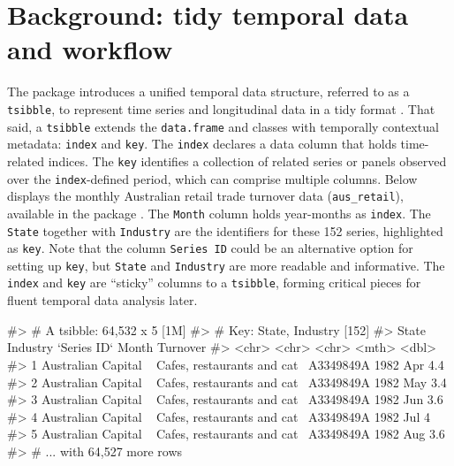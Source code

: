 \hypertarget{background-tidy-temporal-data-and-workflow}{%
\section{Background: tidy temporal data and
workflow}\label{background-tidy-temporal-data-and-workflow}}

The  package \citep{wang2020tsibble} introduces a
unified temporal data structure, referred to as a \texttt{tsibble}, to
represent time series and longitudinal data in a tidy format
\citep{wickham2014tidy}. That said, a \texttt{tsibble} extends the
\texttt{data.frame} and  classes with temporally
contextual metadata: \texttt{index} and \texttt{key}. The \texttt{index}
declares a data column that holds time-related indices. The \texttt{key}
identifies a collection of related series or panels observed over the
\texttt{index}-defined period, which can comprise multiple columns.
Below displays the monthly Australian retail trade turnover data
(\texttt{aus\_retail}), available in the  package
\citep{R-tsibbledata}. The \texttt{Month} column holds year-months as
\texttt{index}. The \texttt{State} together with \texttt{Industry} are
the identifiers for these 152 series, highlighted as \texttt{key}. Note
that the column \texttt{Series\ ID} could be an alternative option for
setting up \texttt{key}, but \texttt{State} and \texttt{Industry} are
more readable and informative. The \texttt{index} and \texttt{key} are
``sticky'' columns to a \texttt{tsibble}, forming critical pieces for
fluent temporal data analysis later.

\begin{Schunk}
\begin{Soutput}
#> # A tsibble: 64,532 x 5 [1M]
#> # Key:       State, Industry [152]
#>   State                Industry                    `Series ID`    Month Turnover
#>   <chr>                <chr>                       <chr>          <mth>    <dbl>
#> 1 Australian Capital ~ Cafes, restaurants and cat~ A3349849A   1982 Apr      4.4
#> 2 Australian Capital ~ Cafes, restaurants and cat~ A3349849A   1982 May      3.4
#> 3 Australian Capital ~ Cafes, restaurants and cat~ A3349849A   1982 Jun      3.6
#> 4 Australian Capital ~ Cafes, restaurants and cat~ A3349849A   1982 Jul      4  
#> 5 Australian Capital ~ Cafes, restaurants and cat~ A3349849A   1982 Aug      3.6
#> # ... with 64,527 more rows
\end{Soutput}
\end{Schunk}

